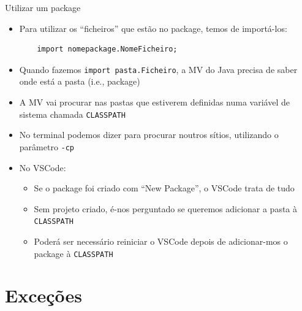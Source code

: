 \documentclass[portuguese, aspectratio=169, xcolor=table]{beamer}
\begin{document}
\begin{frame}[fragile]{Utilizar um package}
\begin{itemize}
\item Para utilizar os ``ficheiros'' que estão no package, temos de importá-los:
\begin{verbatim}
    import nomepackage.NomeFicheiro;
\end{verbatim}
\item Quando fazemos \texttt{import pasta.Ficheiro}, a MV do Java precisa de saber onde está a pasta (i.e., package)
\item A MV vai procurar nas pastas que estiverem definidas numa variável de sistema chamada \texttt{CLASSPATH}
\item No terminal podemos dizer para procurar noutros sítios, utilizando o parâmetro \texttt{-cp}
\item No VSCode:
\begin{itemize}
    \item Se o package foi criado com ``New Package'', o VSCode trata de tudo
    \item Sem projeto criado, é-nos perguntado se queremos adicionar a pasta à \texttt{CLASSPATH}
    \item Poderá ser necessário reiniciar o VSCode depois de adicionar-mos o package à \texttt{CLASSPATH}
\end{itemize}
\end{itemize}
\end{frame}


\section{Exceções}
\end{document}
